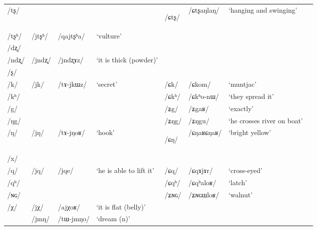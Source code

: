 \documentclass[12pt]{article}
\newcommand{\ipa}[1]{\mbox{\phon/#1/}}
\newcommand{\deux}[1]{\ipa{#1}\addtocounter{2clusters}{1}}
\newcommand{\trois}[1]{\ipa{#1}\addtocounter{3clusters}{1}}
\newcommand{\idph}[1]{\cellcolor{gray}\textbf{#1}}
\newcommand{\resetcounters}[2]{
\newcounter{#1}
\newcounter{#2}
 \setcounter{#1}{\value{2clusters}}
  \setcounter{#2}{\value{3clusters}}
 \setcounter{2clusters}{0}
  \setcounter{3clusters}{0}
}
\begin{document}
\begin{landscape}
\begin{longtable}{llllllll}
\ipa{tʂ} & & & & \deux{ɕtʂ} \idph{} & \ipa{ɕtʂaŋlaŋ} & `hanging and swinging' & \\
\ipa{tʂʰ} & \deux{jtʂʰ} & \ipa{qajtʂʰa} & `vulture' & & & & \\
\ipa{dʐ} & & & & & & & \\
\ipa{ndʐ} & \deux{jndʐ} & \ipa{jndʐɤz} & `it is thick (powder)' & & & & \\
\ipa{ʂ} & & & & & & & \\
\ipa{k} & \deux{jk} & \ipa{tɤ-jkɯz} & `secret' & \deux{ɕk} & \ipa{ɕkom} & `muntjac' & \\
\ipa{kʰ} & & & & \deux{ɕkʰ} & \ipa{ɕkʰo-nɯ} & `they spread it' & \\
\ipa{g} & & & & \deux{ʑg} & \ipa{ʑgaʁ} & `exactly' & \\
\ipa{ŋg} & & & & \deux{ʑŋg} & \ipa{ʑŋgu} & `he crosses river on boat' & \\
\ipa{ŋ} & \deux{jŋ} & \ipa{tɤ-jŋoʁ} & `hook' & \deux{ɕŋ} \idph{} & \ipa{ɕŋaʁɕŋaʁ} & `bright yellow' & \\
\ipa{x} & & & & & & & \\
\ipa{q} & \deux{jq} & \ipa{jqe} & `he is able to lift it' & \deux{ɕq} & \ipa{ɕqɤjɤr} & `cross-eyed' & \\
\ipa{qʰ} & & & & \deux{ɕqʰ} & \ipa{ɕqʰaloʁ} & `latch' & \\
\ipa{ɴɢ} & & & & \deux{ʑɴɢ} & \ipa{ʑɴɢɯloʁ} & `walnut' & \\
\ipa{χ} & \deux{jχ} & \ipa{ajχoʁ} & `it is flat (belly)' & & & & \\
\midrule        
 &\trois{jmŋ} & \ipa{tɯ-jmŋo} & `dream (n)' \\  
 \bottomrule
\end{longtable}
\end{landscape}
   \resetcounters{2jcC}{3jcC} %
   
\end{document}
